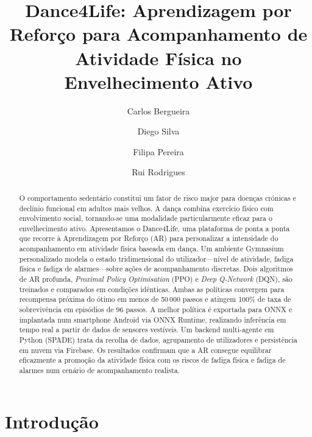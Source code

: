 \documentclass[runningheads]{llncs}
\begin{document}
%
\title{Dance4Life: Aprendizagem por Reforço para Acompanhamento de Atividade Física no Envelhecimento Ativo}
%
%
\author{
Carlos Bergueira \and
Diego Silva \and
Filipa Pereira \and
Rui Rodrigues
}
%
%
%
\maketitle
%
\begin{abstract}
O comportamento sedentário constitui um fator de risco major para doenças crónicas
e declínio funcional em adultos mais velhos. A dança combina exercício físico com
envolvimento social, tornando-se uma modalidade particularmente eficaz para o
envelhecimento ativo. Apresentamos o Dance4Life, uma plataforma de ponta a ponta
que recorre à Aprendizagem por Reforço (AR) para personalizar a intensidade do
acompanhamento em atividade física baseada em dança. Um ambiente Gymnasium
personalizado modela o estado tridimensional do utilizador---nível de atividade,
fadiga física e fadiga de alarmes---sobre ações de acompanhamento discretas. Dois
algoritmos de AR profunda, \emph{Proximal Policy Optimisation} (PPO) e
\emph{Deep Q-Network} (DQN), são treinados e comparados em condições idênticas.
Ambas as políticas convergem para recompensa próxima do ótimo em menos de
50\,000 passos e atingem 100\% de taxa de sobrevivência em episódios de 96 passos.
A melhor política é exportada para ONNX e implantada num smartphone Android via
ONNX Runtime, realizando inferência em tempo real a partir de dados de sensores
vestíveis. Um backend multi-agente em Python (SPADE) trata da recolha de dados,
agrupamento de utilizadores e persistência em nuvem via Firebase. Os resultados
confirmam que a AR consegue equilibrar eficazmente a promoção da atividade física
com os riscos de fadiga física e fadiga de alarmes num cenário de acompanhamento
realista.

\end{abstract}
%
%
\section{Introdução}
\label{sec:intro}
\end{document}
